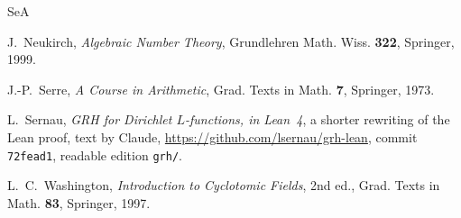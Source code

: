 \documentclass[reqno]{amsart}
\theoremstyle{definition}
\theoremstyle{plain}
\begin{document}
\begin{thebibliography}{SeA}

J.~Neukirch, \emph{Algebraic Number Theory}, Grundlehren Math. Wiss. \textbf{322}, Springer, 1999.

J.-P.~Serre, \emph{A Course in Arithmetic}, Grad. Texts in Math. \textbf{7}, Springer, 1973.

 L.~Sernau, \emph{GRH for Dirichlet \(L\)-functions, in Lean~4}, a shorter rewriting of the Lean proof, text by Claude, \url{https://github.com/lsernau/grh-lean}, commit \texttt{72fead1}, readable edition \texttt{grh/}.

L.~C.~Washington, \emph{Introduction to Cyclotomic Fields}, 2nd ed., Grad. Texts in Math. \textbf{83}, Springer, 1997.

\end{thebibliography}
\end{document}
